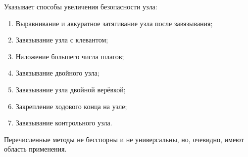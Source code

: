 Указывает способы увеличения безопасности узла:
\begin{enumerate}
\item Выравнивание и аккуратное затягивание узла после завязывания;
\item Завязывание узла с клевантом;
\item Наложение большего числа шлагов;
\item Завязывание двойного узла;
\item Завязывание узла двойной верёвкой;
\item Закрепление ходового конца на узле;
\item Завязывание контрольного узла.
\end{enumerate}
Перечисленные методы не бесспорны и не универсальны, но, очевидно, имеют область применения.


